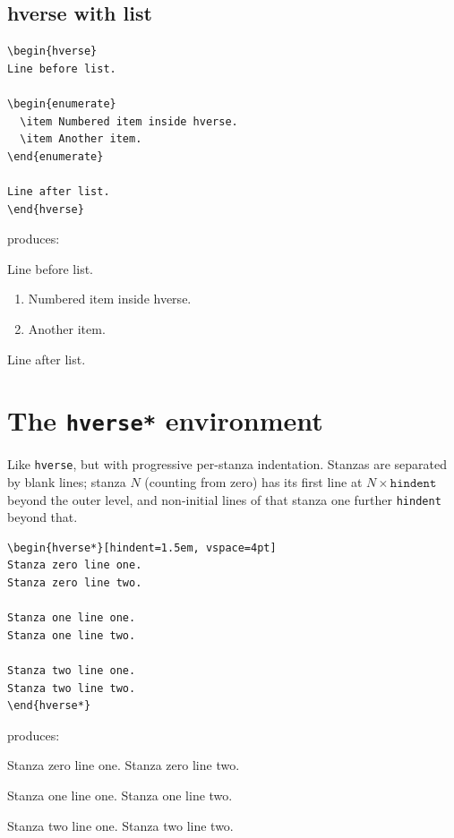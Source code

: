 \documentclass[11pt, twoside, openany]{article}
\newcommand{\opt}[1]{\texttt{#1}}
\newcommand{\env}[1]{\texttt{#1}}
\begin{document}
\subsection{hverse with list}

\begin{verbatim}
\begin{hverse}
Line before list.

\begin{enumerate}
  \item Numbered item inside hverse.
  \item Another item.
\end{enumerate}

Line after list.
\end{hverse}
\end{verbatim}

\noindent produces:

\begin{hverse}
Line before list.

\begin{enumerate}
  \item Numbered item inside hverse.
  \item Another item.
\end{enumerate}

Line after list.
\end{hverse}

\section{The \env{hverse*} environment}

Like \env{hverse}, but with progressive per-stanza indentation. Stanzas are separated by blank lines; stanza $N$ (counting from zero) has its first line at $N \times \opt{hindent}$ beyond the outer level, and non-initial lines of that stanza one further \opt{hindent} beyond that.

\begin{verbatim}
\begin{hverse*}[hindent=1.5em, vspace=4pt]
Stanza zero line one.
Stanza zero line two.

Stanza one line one.
Stanza one line two.

Stanza two line one.
Stanza two line two.
\end{hverse*}
\end{verbatim}

\noindent produces:

\begin{hverse*}[hindent=1.5em, vspace=4pt]
Stanza zero line one.
Stanza zero line two.

Stanza one line one.
Stanza one line two.

Stanza two line one.
Stanza two line two.
\end{hverse*}
\end{document}

